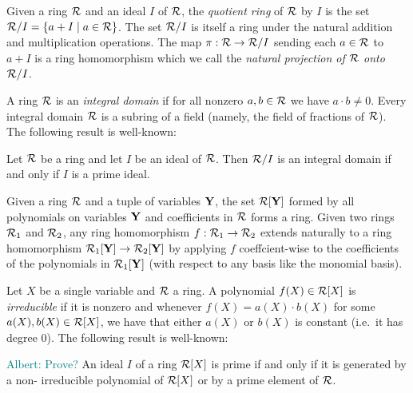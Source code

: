 \documentclass[11pt,letterpaper,usenames,dvipsnames]{article}
\newcommand{\albert}[1]{\textcolor{teal}{Albert: {#1}}}
\begin{document}
Given a ring $\mathcal{R}$ and an ideal $I$ of $\mathcal{R}$, the \emph{quotient ring} of $\mathcal{R}$ by $I$ is the set  $\mathcal{R}/I =\{a+I \mid a\in \mathcal{R}\}$. The set $\mathcal{R}/I$ is itself a ring under the natural addition and multiplication operations.  The map $\pi:\mathcal{R}\to \mathcal{R}/I$ sending each $a\in \mathcal{R}$ to $a+I$ is a ring homomorphism which we call the \emph{natural projection of $\mathcal{R}$ onto $\mathcal{R}/I$.}

A ring $\mathcal{R}$ is an \emph{integral domain} if for all nonzero $a,b\in \mathcal{R}$ we have $a\cdot b\neq 0$. Every integral domain $\mathcal{R}$ is a subring of a field (namely, the field of fractions of $\mathcal{R}$). The following result is well-known:
\begin{remark}\label{r: domain_prime}
Let $\mathcal{R}$ be a ring and let $I$  be an ideal of $\mathcal{R}$. Then $\mathcal{R}/I$ is an integral domain if and only if $I$ is a prime ideal.
\end{remark}

Given a ring $\mathcal{R}$ and a tuple of variables $\mathbf{Y}$, the set $\mathcal{R}[\mathbf{Y}]$ formed by all polynomials on variables $\mathbf{Y}$ and coefficients in $\mathcal{R}$ forms a ring. Given two rings $\mathcal{R}_1$ and $\mathcal{R}_2$, any ring homomorphism $f:\mathcal{R}_1 \to \mathcal{R}_2$  extends naturally to a ring homomorphism $\mathcal{R}_1[\mathbf{Y}] \to \mathcal{R}_2[\mathbf{Y}]$ by applying $f$ coeffcient-wise to the coefficients of the polynomials in $\mathcal{R}_1[\mathbf{Y}]$ (with respect to any basis like the monomial basis). 

Let $X$ be a single variable and $\mathcal{R}$ a ring. A polynomial $f(X)\in \mathcal{R}[X]$ is \emph{irreducible} if it is nonzero and whenever $f(X)=a(X)\cdot b(X)$ for some $a(X), b(X)\in \mathcal{R}[X]$, we have that either $a(X)$ or $b(X)$ is constant (i.e.\ it has degree $0$). The following result is well-known:
\begin{remark}\label{r: prime_ideals_of_RX}
\albert{Prove?} An ideal $I$ of a ring $\mathcal{R}[X]$ is prime if and only if it is generated by a non- irreducible polynomial of $\mathcal{R}[X]$ or by a prime element of $\mathcal{R}$.
\end{remark}
\end{document}
